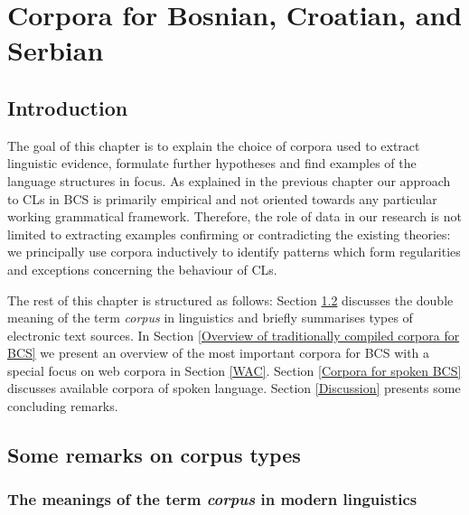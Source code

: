 \chapter{Corpora for Bosnian, Croatian, and Serbian}
\label{Corpora for Bosnian, Croatian and Serbian}
\section{Introduction}
The goal of this chapter is to explain the choice of corpora used to extract linguistic evidence, formulate further hypotheses and find examples of the language structures in focus. As explained in the previous chapter our approach to CLs in BCS is primarily empirical and not oriented towards any particular working grammatical framework. Therefore, the role of data in our research is not limited to extracting examples confirming or contradicting the existing theories: we principally use corpora inductively to identify patterns which form regularities and exceptions concerning the behaviour of CLs. 

The rest of this chapter is structured as follows: Section \ref{Some remarks on corpus types} discusses the double meaning of the term \textit{corpus} in linguistics and briefly summarises types of electronic text sources. In Section \ref{Overview of traditionally compiled corpora for BCS} we present an overview of the most important corpora for BCS with a special focus on web corpora in Section \ref{WAC}. Section \ref{Corpora for spoken BCS} discusses available corpora of spoken language. Section \ref{Discussion} presents some concluding remarks. 

\section{Some remarks on corpus types}
\label{Some remarks on corpus types}
\subsection{The meanings of the term \textit{corpus} in modern linguistics}

